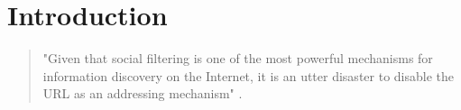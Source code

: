 \documentclass[english]{ifimaster}
\begin{document}
\tableofcontents
\listoffigures{}
\lstlistoflistings{}
















\mainmatter
\chapter{Introduction}
\begin{quotation} 
\noindent "Given that social filtering is one of the most powerful mechanisms for information discovery on the Internet, it is an utter disaster to disable the URL as an addressing mechanism" \parencite{nielsenFrames}.
\end{quotation}
\end{document}

